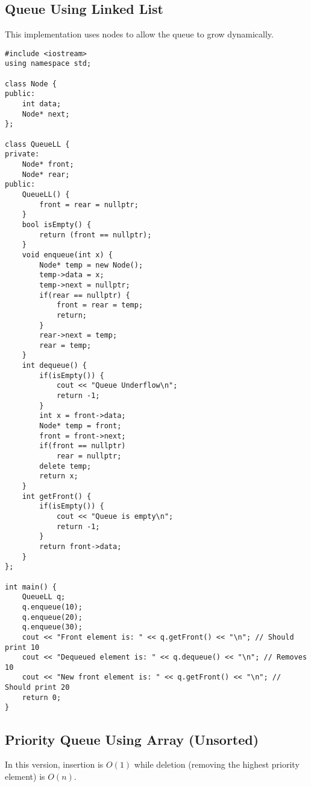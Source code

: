 \subsection{Queue Using Linked List}
This implementation uses nodes to allow the queue to grow dynamically.

\begin{lstlisting}[caption={C++ implementation of a Queue using a Linked List}]
#include <iostream>
using namespace std;

class Node {
public:
    int data;
    Node* next;
};

class QueueLL {
private:
    Node* front;
    Node* rear;
public:
    QueueLL() {
        front = rear = nullptr;
    }
    bool isEmpty() {
        return (front == nullptr);
    }
    void enqueue(int x) {
        Node* temp = new Node();
        temp->data = x;
        temp->next = nullptr;
        if(rear == nullptr) {
            front = rear = temp;
            return;
        }
        rear->next = temp;
        rear = temp;
    }
    int dequeue() {
        if(isEmpty()) {
            cout << "Queue Underflow\n";
            return -1;
        }
        int x = front->data;
        Node* temp = front;
        front = front->next;
        if(front == nullptr)
            rear = nullptr;
        delete temp;
        return x;
    }
    int getFront() {
        if(isEmpty()) {
            cout << "Queue is empty\n";
            return -1;
        }
        return front->data;
    }
};

int main() {
    QueueLL q;
    q.enqueue(10);
    q.enqueue(20);
    q.enqueue(30);
    cout << "Front element is: " << q.getFront() << "\n"; // Should print 10
    cout << "Dequeued element is: " << q.dequeue() << "\n"; // Removes 10
    cout << "New front element is: " << q.getFront() << "\n"; // Should print 20
    return 0;
}
\end{lstlisting}

\subsection{Priority Queue Using Array (Unsorted)}
In this version, insertion is \( O(1) \) while deletion (removing the highest priority element) is \( O(n) \).

